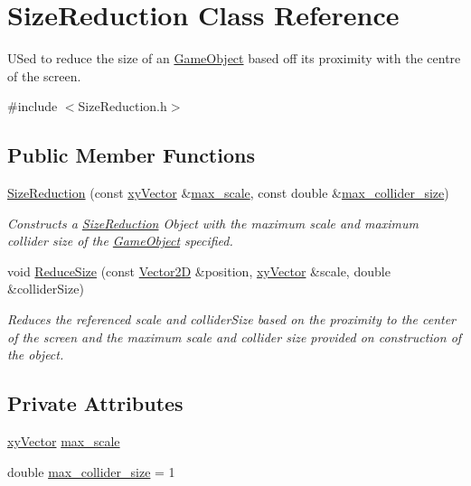\hypertarget{class_size_reduction}{}\section{Size\+Reduction Class Reference}
\label{class_size_reduction}


U\+Sed to reduce the size of an \hyperlink{class_game_object}{Game\+Object} based off its proximity with the centre of the screen.  




{\ttfamily \#include $<$Size\+Reduction.\+h$>$}

\subsection*{Public Member Functions}
\begin{DoxyCompactItemize}
\item 
\hyperlink{class_size_reduction_a2e274f3e867ac457d0fd354351426035}{Size\+Reduction} (const \hyperlink{structxy_vector}{xy\+Vector} \&\hyperlink{class_size_reduction_a99ace47c7794d51e539712a3c2bc8642}{max\+\_\+scale}, const double \&\hyperlink{class_size_reduction_aa58dd5c70892ea019a7e6c86e2027f8f}{max\+\_\+collider\+\_\+size})
\begin{DoxyCompactList}\small\item\em Constructs a \hyperlink{class_size_reduction}{Size\+Reduction} Object with the maximum scale and maximum collider size of the \hyperlink{class_game_object}{Game\+Object} specified. \end{DoxyCompactList}\item 
void \hyperlink{class_size_reduction_aee72365a4e351318fb49ae5c8c6da0f7}{Reduce\+Size} (const \hyperlink{class_vector2_d}{Vector2D} \&position, \hyperlink{structxy_vector}{xy\+Vector} \&scale, double \&collider\+Size)
\begin{DoxyCompactList}\small\item\em Reduces the referenced scale and collider\+Size based on the proximity to the center of the screen and the maximum scale and collider size provided on construction of the object. \end{DoxyCompactList}\end{DoxyCompactItemize}
\subsection*{Private Attributes}
\begin{DoxyCompactItemize}
\item 
\hyperlink{structxy_vector}{xy\+Vector} \hyperlink{class_size_reduction_a99ace47c7794d51e539712a3c2bc8642}{max\+\_\+scale}
\item 
double \hyperlink{class_size_reduction_aa58dd5c70892ea019a7e6c86e2027f8f}{max\+\_\+collider\+\_\+size} = 1
\end{DoxyCompactItemize}


